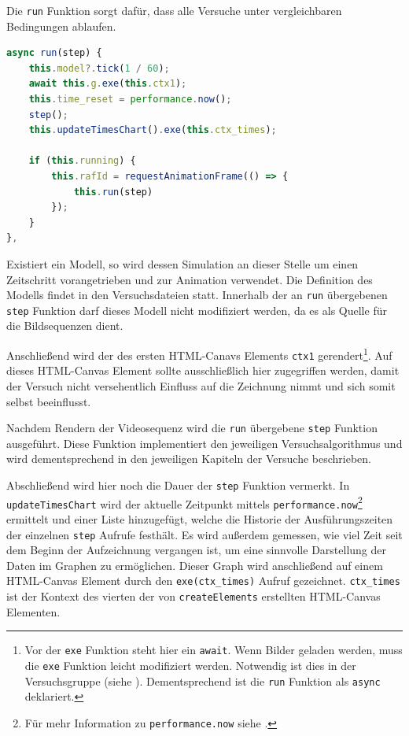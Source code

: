 Die \lstinline{run} Funktion sorgt dafür, dass alle Versuche unter vergleichbaren Bedingungen ablaufen.

\begin{lstlisting}[language=JavaScript, caption={Definition der \lstinline{simulation.run} Funktion.}, label={lst:sim_run}]
async run(step) {
    this.model?.tick(1 / 60);
    await this.g.exe(this.ctx1);
    this.time_reset = performance.now();
    step();
    this.updateTimesChart().exe(this.ctx_times);

    if (this.running) {
        this.rafId = requestAnimationFrame(() => {
            this.run(step)
        });
    }
},
\end{lstlisting}

Existiert ein  Modell, so wird dessen Simulation an dieser Stelle um einen Zeitschritt vorangetrieben und zur Animation verwendet.
Die Definition des  Modells findet in den Versuchsdateien statt.
Innerhalb der an \lstinline{run} übergebenen \lstinline{step} Funktion darf dieses Modell nicht modifiziert werden, da es als Quelle für die Bildsequenzen dient.

Anschlie{\ss}end wird der  des ersten  HTML-Canavs Elements \lstinline{ctx1} gerendert\footnote{Vor der \lstinline{exe} Funktion steht hier ein \lstinline{await}. Wenn Bilder geladen werden, muss die \lstinline{exe} Funktion leicht modifiziert werden. Notwendig ist dies in der Versuchsgruppe  (siehe ).
Dementsprechend ist die \lstinline{run} Funktion als \lstinline{async} deklariert.}.
Auf dieses HTML-Canvas Element sollte ausschlie{\ss}lich hier zugegriffen werden, damit der Versuch nicht versehentlich Einfluss auf die Zeichnung nimmt und sich somit selbst beeinflusst.

Nachdem Rendern der Videosequenz wird die \lstinline{run} übergebene \lstinline{step} Funktion ausgeführt.
Diese Funktion implementiert den jeweiligen Versuchsalgorithmus und wird dementsprechend in den jeweiligen Kapiteln der Versuche beschrieben.

Abschlie{\ss}end wird hier noch die Dauer der \lstinline{step} Funktion vermerkt.
In \lstinline{updateTimesChart} wird der aktuelle Zeitpunkt mittels \lstinline{performance.now}\footnote{Für mehr Information zu \lstinline{performance.now} siehe .} ermittelt und einer Liste hinzugefügt, welche die Historie der Ausführungszeiten der einzelnen \lstinline{step} Aufrufe festhält.
Es wird au{\ss}erdem gemessen, wie viel Zeit seit dem Beginn der Aufzeichnung vergangen ist, um eine sinnvolle Darstellung der Daten im Graphen zu ermöglichen.
Dieser Graph wird anschlie{\ss}end auf einem HTML-Canvas Element durch den \lstinline{exe(ctx_times)} Aufruf gezeichnet.
\lstinline{ctx_times} ist der Kontext des vierten der von \lstinline{createElements} erstellten HTML-Canvas Elementen.

